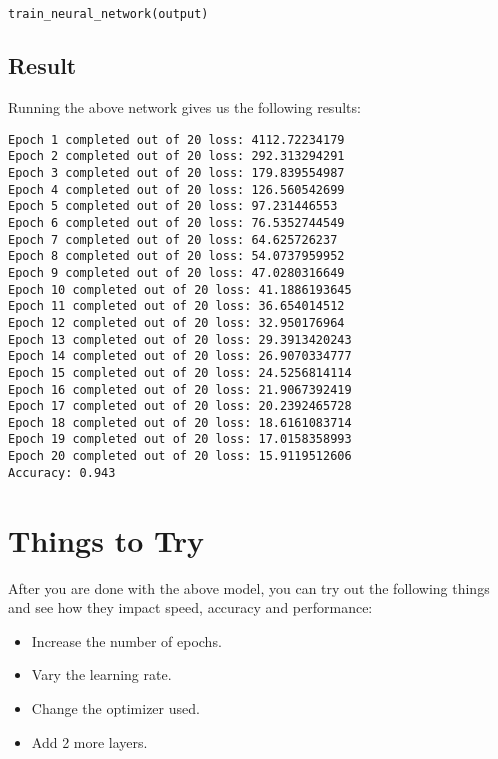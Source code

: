 \documentclass[Proceedings]{ascelike}
\begin{document}
\begin{lstlisting}[language=Python]
train_neural_network(output)
\end{lstlisting}

\subsection{Result}
Running the above network gives us the following results:

\begin{lstlisting}
Epoch 1 completed out of 20 loss: 4112.72234179
Epoch 2 completed out of 20 loss: 292.313294291
Epoch 3 completed out of 20 loss: 179.839554987
Epoch 4 completed out of 20 loss: 126.560542699
Epoch 5 completed out of 20 loss: 97.231446553
Epoch 6 completed out of 20 loss: 76.5352744549
Epoch 7 completed out of 20 loss: 64.625726237
Epoch 8 completed out of 20 loss: 54.0737959952
Epoch 9 completed out of 20 loss: 47.0280316649
Epoch 10 completed out of 20 loss: 41.1886193645
Epoch 11 completed out of 20 loss: 36.654014512
Epoch 12 completed out of 20 loss: 32.950176964
Epoch 13 completed out of 20 loss: 29.3913420243
Epoch 14 completed out of 20 loss: 26.9070334777
Epoch 15 completed out of 20 loss: 24.5256814114
Epoch 16 completed out of 20 loss: 21.9067392419
Epoch 17 completed out of 20 loss: 20.2392465728
Epoch 18 completed out of 20 loss: 18.6161083714
Epoch 19 completed out of 20 loss: 17.0158358993
Epoch 20 completed out of 20 loss: 15.9119512606
Accuracy: 0.943
\end{lstlisting}
\newpage

\section{Things to Try}
After you are done with the above model, you can try out the following things and see how they impact speed, accuracy and performance:
\begin{itemize}
    \item Increase the number of epochs.
    \item Vary the learning rate.
    \item Change the optimizer used.
    \item Add 2 more layers.
\end{itemize}
\end{document}
